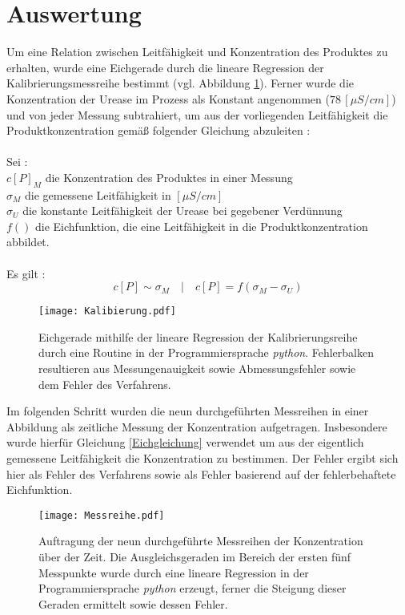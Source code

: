 %
%

\section {Auswertung}
Um eine Relation zwischen Leitfähigkeit und Konzentration des Produktes zu erhalten, wurde eine Eichgerade durch die lineare Regression der Kalibrierungsmessreihe bestimmt (vgl. Abbildung \ref{Eichgerade}). Ferner wurde die Konzentration der Urease im Prozess als Konstant angenommen ($ 78\,[\si{\mu S/cm}]$) und von jeder Messung subtrahiert, um aus der vorliegenden Leitfähigkeit die Produktkonzentration gemäß folgender Gleichung abzuleiten : \\
\\
Sei : \\
 $c[P]_M$ die Konzentration des Produktes in einer Messung\\
 $\sigma_M$ die gemessene Leitfähigkeit in $[\si{\mu S/cm}]$\\
  $\sigma_U$ die konstante Leitfähigkeit der Urease bei gegebener Verdünnung \\
  $f()$ die Eichfunktion, die eine Leitfähigkeit in die Produktkonzentration abbildet.\\
  \\
  Es gilt :
\begin{equation}
c[P]  \sim \sigma_M \quad| \quad c[P]=f(\sigma_M-\sigma_U)
\label{Eichgleichung}
\end{equation}
\begin{figure}[H]
	\centering	
	\begin{minipage}{1\textwidth}
		\texttt{[image: Kalibierung.pdf]}
	\end{minipage}
	\caption{Eichgerade mithilfe der lineare Regression der Kalibrierungsreihe durch eine Routine in der Programmiersprache \textit{python}. Fehlerbalken resultieren aus Messungenauigkeit sowie Abmessungsfehler sowie dem Fehler des Verfahrens.}
	\label{Eichgerade}
\end{figure}
Im folgenden Schritt wurden die neun durchgeführten Messreihen in einer Abbildung als zeitliche Messung der Konzentration aufgetragen. Insbesondere wurde hierfür Gleichung \ref{Eichgleichung} verwendet um aus der eigentlich gemessene Leitfähigkeit die Konzentration zu bestimmen. Der Fehler ergibt sich hier als Fehler des Verfahrens sowie als Fehler basierend auf der fehlerbehaftete Eichfunktion.
\newpage
\begin{figure}[H]
	\centering	
	\begin{minipage}{1\textwidth}
		\texttt{[image: Messreihe.pdf]}
	\end{minipage}
	\caption{Auftragung der neun durchgeführte Messreihen der Konzentration über der Zeit. Die Ausgleichsgeraden im Bereich der ersten fünf Messpunkte wurde durch eine lineare Regression in der Programmiersprache \textit{python} erzeugt, ferner die Steigung dieser Geraden ermittelt sowie dessen Fehler.}
	\label{Messreihe}
\end{figure}
